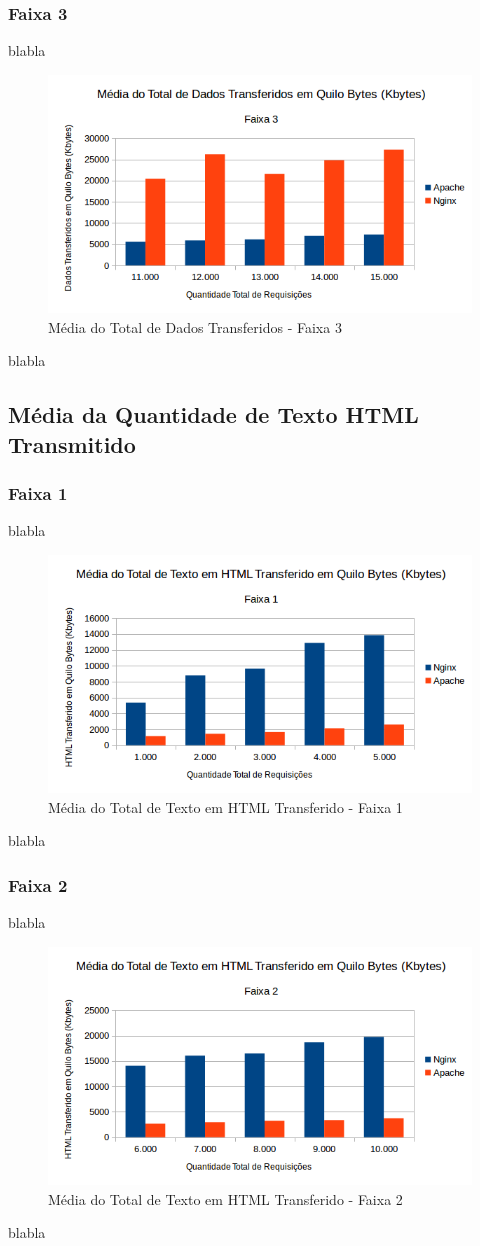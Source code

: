 \subsubsection{Faixa 3}
blabla

\begin{figure}[htb]
	\centering
	\includegraphics[width=0.6\linewidth]{graficos/grafico2-f3} 
	\caption{Média do Total de Dados Transferidos - Faixa 3}
	\label{fig:grafico2-f3}
\end{figure}
blabla

\subsection{Média da Quantidade de Texto HTML Transmitido}
\subsubsection{Faixa 1}

blabla
\begin{figure}[htb]
	\centering
	\includegraphics[width=0.6\linewidth]{graficos/grafico3-f1} 
	\caption{Média do Total de Texto em HTML Transferido - Faixa 1}
	\label{fig:grafico3-f1}
\end{figure}

blabla

\subsubsection{Faixa 2}
blabla

\begin{figure}[htb]
	\centering
	\includegraphics[width=0.6\linewidth]{graficos/grafico3-f2} 
	\caption{Média do Total de Texto em HTML Transferido - Faixa 2}
	\label{fig:grafico3-f2}
\end{figure}
blabla

